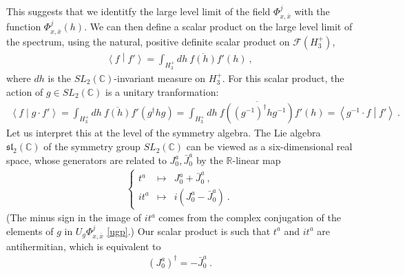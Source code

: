 \documentclass[12pt,a4paper,notitlepage]{report}
\numberwithin{equation}{section}
\theoremstyle{break}
\begin{document}
This suggests that we identitfy the large level limit of the field $\Phi^j_{x,\bar{x}}$ with the function $\Phi^j_{x,\bar{x}}(h)$. 
We can then define a scalar product on the large level limit of the spectrum, using the natural, positive definite scalar product on $\mathcal{F}(H_3^+)$, 
\begin{align}
 \left\langle f \middle| f' \right\rangle = \int_{H_3^+} dh\ \overline{f(h)} f'(h)\ ,
\end{align}
where $dh$ is the $SL_2({\mathbb{C}})$-invariant measure on $H_3^+$.
For this scalar product, the action of $g\in SL_2({\mathbb{C}})$ is a unitary tranformation:
\begin{align}
 \left\langle f \middle| g\cdot f'\right\rangle = \int_{H_3^+}dh\ \overline{f(h)} f'(g^\dagger h g) = \int_{H_3^+}dh\ \overline{f((g^{-1})^\dagger h g^{-1})} f'(h) = \left\langle g^{-1}\cdot f \middle| f'\right\rangle\ .
\end{align}
Let us interpret this at the level of the symmetry algebra.
The Lie algebra $\mathfrak{sl}_2({\mathbb{C}})$ of the symmetry group $SL_2({\mathbb{C}})$ can be viewed as a six-dimensional real space, whose generators are related to $J^a_0, \bar{J}^a_0$ by the ${\mathbb{R}}$-linear map
\begin{align}
 \left\{\begin{array}{lcl} t^a & \mapsto & J_0^a + \bar{J}_0^a \ ,  \\ it^a & \mapsto & i(J^a_0 - \bar{J}^a_0)\ . \end{array}\right. 
\end{align}
(The minus sign in the image of $it^a$ comes from the complex conjugation of the elements of $g$ in $U_g\Phi^j_{x,\bar{x}}$ \eqref{ugp}.)
Our scalar product is such that $t^a$ and $it^a$ are antihermitian, which is equivalent to
\begin{align}
 (J^a_0)^\dagger = -\bar{J}^a_0\ .
\label{jzd}
\end{align}
\end{document}

